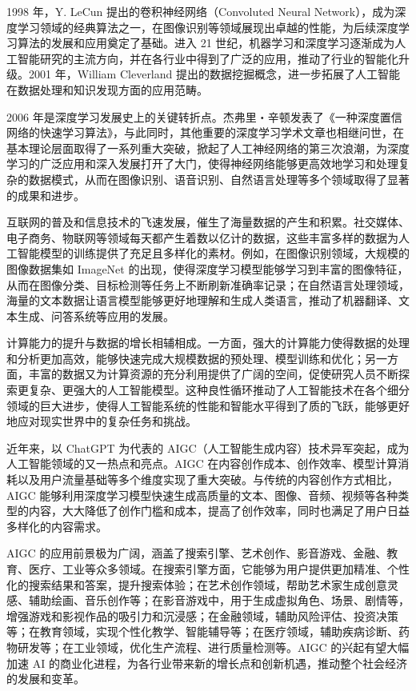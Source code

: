 1998 年，Y. LeCun 提出的卷积神经网络（Convoluted Neural Network），成为深度学习领域的经典算法之一，在图像识别等领域展现出卓越的性能，为后续深度学习算法的发展和应用奠定了基础。进入 21 世纪，机器学习和深度学习逐渐成为人工智能研究的主流方向，并在各行业中得到了广泛的应用，推动了行业的智能化升级。2001 年，William Cleverland 提出的数据挖掘概念，进一步拓展了人工智能在数据处理和知识发现方面的应用范畴。


2006 年是深度学习发展史上的关键转折点。杰弗里・辛顿发表了《一种深度置信网络的快速学习算法》，与此同时，其他重要的深度学习学术文章也相继问世，在基本理论层面取得了一系列重大突破，掀起了人工神经网络的第三次浪潮，为深度学习的广泛应用和深入发展打开了大门，使得神经网络能够更高效地学习和处理复杂的数据模式，从而在图像识别、语音识别、自然语言处理等多个领域取得了显著的成果和进步。


互联网的普及和信息技术的飞速发展，催生了海量数据的产生和积累。社交媒体、电子商务、物联网等领域每天都产生着数以亿计的数据，这些丰富多样的数据为人工智能模型的训练提供了充足且多样化的素材。例如，在图像识别领域，大规模的图像数据集如 ImageNet 的出现，使得深度学习模型能够学习到丰富的图像特征，从而在图像分类、目标检测等任务上不断刷新准确率记录；在自然语言处理领域，海量的文本数据让语言模型能够更好地理解和生成人类语言，推动了机器翻译、文本生成、问答系统等应用的发展。


计算能力的提升与数据的增长相辅相成。一方面，强大的计算能力使得数据的处理和分析更加高效，能够快速完成大规模数据的预处理、模型训练和优化；另一方面，丰富的数据又为计算资源的充分利用提供了广阔的空间，促使研究人员不断探索更复杂、更强大的人工智能模型。这种良性循环推动了人工智能技术在各个细分领域的巨大进步，使得人工智能系统的性能和智能水平得到了质的飞跃，能够更好地应对现实世界中的复杂任务和挑战。


近年来，以 ChatGPT 为代表的 AIGC（人工智能生成内容）技术异军突起，成为人工智能领域的又一热点和亮点。AIGC 在内容创作成本、创作效率、模型计算消耗以及用户流量基础等多个维度实现了重大突破。与传统的内容创作方式相比，AIGC 能够利用深度学习模型快速生成高质量的文本、图像、音频、视频等各种类型的内容，大大降低了创作门槛和成本，提高了创作效率，同时也满足了用户日益多样化的内容需求。


AIGC 的应用前景极为广阔，涵盖了搜索引擎、艺术创作、影音游戏、金融、教育、医疗、工业等众多领域。在搜索引擎方面，它能够为用户提供更加精准、个性化的搜索结果和答案，提升搜索体验；在艺术创作领域，帮助艺术家生成创意灵感、辅助绘画、音乐创作等；在影音游戏中，用于生成虚拟角色、场景、剧情等，增强游戏和影视作品的吸引力和沉浸感；在金融领域，辅助风险评估、投资决策等；在教育领域，实现个性化教学、智能辅导等；在医疗领域，辅助疾病诊断、药物研发等；在工业领域，优化生产流程、进行质量检测等。AIGC 的兴起有望大幅加速 AI 的商业化进程，为各行业带来新的增长点和创新机遇，推动整个社会经济的发展和变革。


